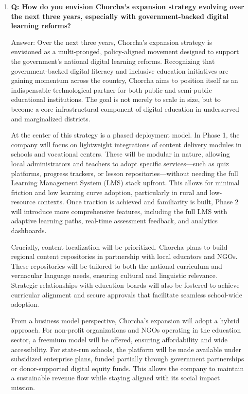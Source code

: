 \documentclass[12pt,a4paper,oneside]{book}
\begin{document}
\begin{enumerate}
\item \textbf{Q: How do you envision Chorcha's expansion strategy evolving over the next three years, especially with government-backed digital learning reforms?}

Answer: Over the next three years, Chorcha’s expansion strategy is envisioned as a multi-pronged, policy-aligned movement designed to support the government’s national digital learning reforms. Recognizing that government-backed digital literacy and inclusive education initiatives are gaining momentum across the country, Chorcha aims to position itself as an indispensable technological partner for both public and semi-public educational institutions. The goal is not merely to scale in size, but to become a core infrastructural component of digital education in underserved and marginalized districts.

At the center of this strategy is a phased deployment model. In Phase 1, the company will focus on lightweight integrations of content delivery modules in schools and vocational centers. These will be modular in nature, allowing local administrators and teachers to adopt specific services—such as quiz platforms, progress trackers, or lesson repositories—without needing the full Learning Management System (LMS) stack upfront. This allows for minimal friction and low learning curve adoption, particularly in rural and low-resource contexts. Once traction is achieved and familiarity is built, Phase 2 will introduce more comprehensive features, including the full LMS with adaptive learning paths, real-time assessment feedback, and analytics dashboards.

Crucially, content localization will be prioritized. Chorcha plans to build regional content repositories in partnership with local educators and NGOs. These repositories will be tailored to both the national curriculum and vernacular language needs, ensuring cultural and linguistic relevance. Strategic relationships with education boards will also be fostered to achieve curricular alignment and secure approvals that facilitate seamless school-wide adoption.


From a business model perspective, Chorcha’s expansion will adopt a hybrid approach. For non-profit organizations and NGOs operating in the education sector, a freemium model will be offered, ensuring affordability and wide accessibility. For state-run schools, the platform will be made available under subsidized enterprise plans, funded partially through government partnerships or donor-supported digital equity funds. This allows the company to maintain a sustainable revenue flow while staying aligned with its social impact mission.


\end{enumerate}
\end{document}
